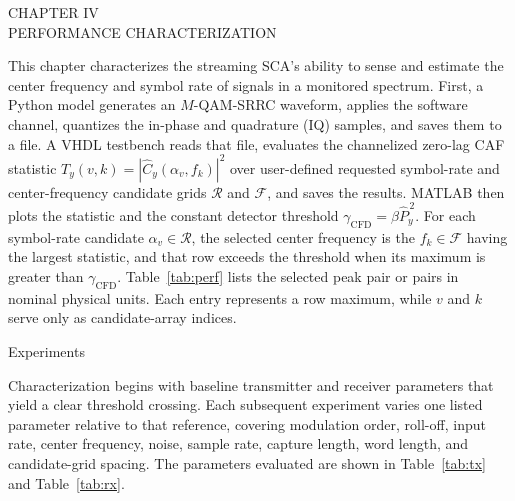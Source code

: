 \newpage
{}

\begin{center}
  \vspace*{1.65in}
  CHAPTER IV\\
  PERFORMANCE CHARACTERIZATION
\end{center}

\bigskip
This chapter characterizes the streaming SCA's ability to sense and estimate the center frequency and symbol rate of signals in a monitored spectrum.  First, a Python model generates an $M$-QAM-SRRC waveform, applies the software channel, quantizes the in-phase and quadrature (IQ) samples, and saves them to a file.  A VHDL testbench reads that file, evaluates the channelized zero-lag CAF statistic $T_y(v,k)=|\widehat{C}_{y}(\alpha_v,f_k)|^2$ over user-defined requested symbol-rate and center-frequency candidate grids $\mathcal{R}$ and $\mathcal{F}$, and saves the results.  MATLAB then plots the statistic and the constant detector threshold $\gamma_{\mathrm{CFD}}=\beta\widehat{P}_{y}^{\,2}$.  For each symbol-rate candidate $\alpha_v\in\mathcal{R}$, the selected center frequency is the $f_k\in\mathcal{F}$ having the largest statistic, and that row exceeds the threshold when its maximum is greater than $\gamma_{\mathrm{CFD}}$.  Table~\ref{tab:perf} lists the selected peak pair or pairs in nominal physical units.  Each entry represents a row maximum, while $v$ and $k$ serve only as candidate-array indices.

%
%
\bigskip
{}
  \quad Experiments

Characterization begins with baseline transmitter and receiver parameters that yield a clear threshold crossing.  Each subsequent experiment varies one listed parameter relative to that reference, covering modulation order, roll-off, input rate, center frequency, noise, sample rate, capture length, word length, and candidate-grid spacing.  The parameters evaluated are shown in Table~\ref{tab:tx} and Table~\ref{tab:rx}.


